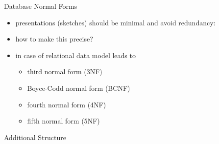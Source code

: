\begin{frame}{Database Normal Forms}
\begin{itemize}
\item presentations (sketches) should be minimal and avoid redundancy:
\item how to make this precise?
\item in case of relational data model leads to 
   \begin{itemize}
     \item third normal form (3NF)
     \item Boyce-Codd normal form (BCNF)
     \item fourth normal form (4NF)
     \item fifth normal form (5NF)
   \end{itemize}
\end{itemize}
\end{frame}

\begin{frame}{Additional Structure}
\resizebox{11.3cm}{!}{

\featurelist
}
\end{frame}

